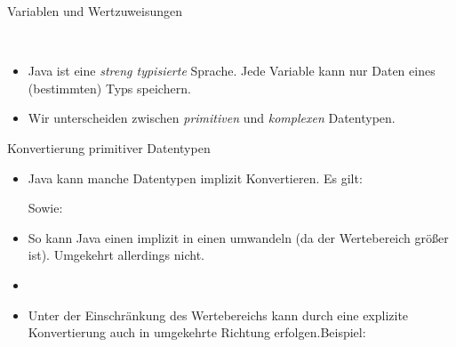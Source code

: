 \begin{frame}{Variablen und Wertzuweisungen}
    \pause{}
    \begin{center}
        \parbox{7cm}{\!\\
        }
    \end{center}
    \begin{itemize}[<+(1)->]
        \widei
        \item Java ist eine \emph{streng typisierte} Sprache.\pause{} Jede Variable kann nur Daten eines (bestimmten) Typs speichern.
        \item Wir unterscheiden zwischen \emph{primitiven} und \emph{komplexen} Datentypen. 
    \end{itemize}
\end{frame}

\begin{frame}{Konvertierung primitiver Datentypen}
    \begin{itemize}[<+(1)->]
        \widei
        \item Java kann manche Datentypen implizit Konvertieren.\pause{} Es gilt:\pause{}
        \begin{center}
             \mprec{}  \mprec{}  \mprec{}  \mprec{}  \mprec{} 
        \end{center}
        \pause{}Sowie:\pause{}
        \begin{center}
             \mprec{} 
        \end{center}
        \item So kann Java einen  implizit in einen  umwandeln\pause{} (da der Wertebereich größer ist).\pause{} Umgekehrt allerdings nicht.
        \item {}
        \item Unter der Einschränkung des Wertebereichs kann durch  eine explizite Konvertierung auch in umgekehrte Richtung erfolgen.\hfill \pause{}Beispiel: 
    \end{itemize}
\end{frame}

